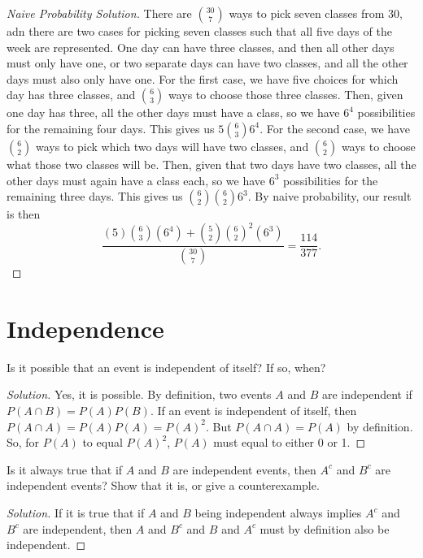 \documentclass[10pt]{article}
\newenvironment{problem}[2][Problem]{\begin{trivlist}
\item[\hskip \labelsep {\bfseries #1}\hskip \labelsep {\bfseries #2.}]}{\end{trivlist}}
\begin{document}
\begin{proof}[Naive Probability Solution]

There are \(\binom{30}{7}\) ways to pick seven classes from 30, adn there are two cases for picking seven classes such that all five days of the week are represented. One day can have three classes, and then all other days must only have one, or two separate days can have two classes, and all the other days must also only have one. For the first case, we have five choices for which day has three classes, and \(\binom{6}{3}\) ways to choose those three classes. Then, given one day has three, all the other days must have a class, so we have $6^4$ possibilities for the remaining four days. This gives us \(5 \binom{6}{3} 6^4\). For the second case, we have \(\binom{6}{2}\) ways to pick which two days will have two classes, and \(\binom{6}{2}\) ways to choose what those two classes will be. Then, given that two days have two classes, all the other days must again have a class each, so we have $6^3$ possibilities for the remaining three days. This gives us \(\binom{6}{2} \binom{6}{2} 6^3\). By naive probability, our result is then
\[
    \frac{(5) \binom{6}{3} (6^4) + \binom{5}{2} \binom{6}{2}^2 (6^3)}{\binom{30}{7}} = \frac{114}{377}.
\]
\end{proof}

\section{Independence}

\begin{problem}{1} 
Is it possible that an event is independent of itself? If so, when?
\end{problem}

\begin{proof}[Solution]
Yes, it is possible. By definition, two events $A$ and $B$ are independent if $P(A \cap B) = P(A)P(B)$. If an event is independent of itself, then $P(A \cap A) = P(A)P(A) = P(A)^2$. But $P(A \cap A) = P(A)$ by definition. So, for $P(A)$ to equal $P(A)^2$, $P(A)$ must equal to either 0 or 1.
\end{proof}

\begin{problem}{2} 
Is it always true that if $A$ and $B$ are independent events, then $A^c$ and $B^c$ are
independent events? Show that it is, or give a counterexample.
\end{problem}

\begin{proof}[Solution]
If it is true that if $A$ and $B$ being independent always implies $A^c$ and $B^c$ are independent, then $A$ and $B^c$ and $B$ and $A^c$ must by definition also be independent.

\end{proof}
\end{document}
